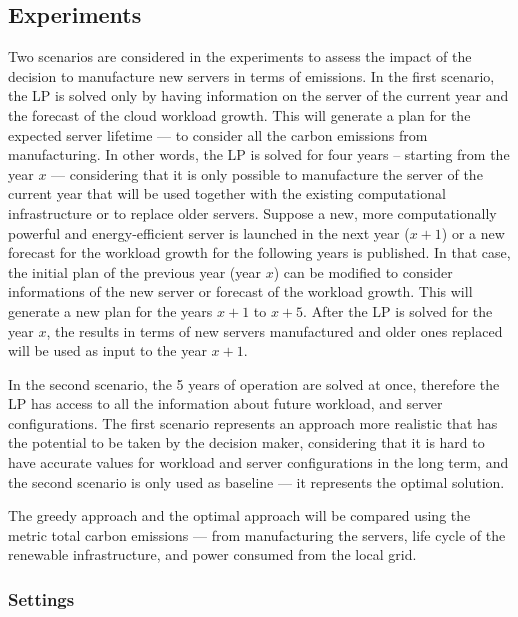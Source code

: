 \subsection{Experiments}


Two scenarios are considered in the experiments to assess the impact of the decision to manufacture new servers in terms of  emissions.  In the first scenario, the LP is solved only by having information on the server of the current year and the forecast of the cloud workload growth. This will generate a plan for the expected server lifetime --- to consider all the carbon emissions from manufacturing. In other words, the LP is solved for four years -- starting from the year $x$ --- considering that it is only possible to manufacture the server of the current year that will be used together with the existing computational infrastructure or to replace older servers. Suppose a new, more computationally powerful and energy-efficient server is launched in the next year ($x+1$) or a new forecast for the workload growth for the following years is published. In that case, the initial plan of the previous year (year $x$) can be modified to consider informations of the new server or forecast of the workload growth. This will generate a new plan for the years $x+1$ to $x+5$. After the LP is solved for the year $x$, the results in terms of new servers manufactured and older ones replaced will be used as input to the year $x +1$.


In the second scenario, the 5 years of operation are solved at once, therefore the LP has access to all the information about future workload, and server configurations. The first scenario represents an approach more realistic that has the potential to be taken by the decision maker, considering that it is hard to have accurate values for workload and server configurations in the long term, and the second scenario is only used as baseline --- it represents the optimal solution.

The greedy approach and the optimal approach will be compared using the metric total carbon emissions --- from manufacturing the servers, life cycle of the renewable infrastructure, and power consumed from the local grid.

\subsubsection{Settings}

